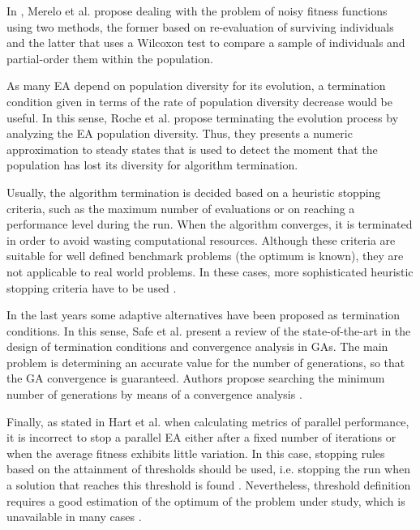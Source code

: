 \documentclass[runningheads,a4paper]{llncs}
\begin{document}


In \cite{merelo14:noisy}, Merelo et al. propose dealing with the problem of noisy fitness functions using two methods, the former based on re-evaluation of surviving individuals and the latter that uses a Wilcoxon test to compare a sample of individuals and partial-order them within the population.


As many EA depend on population diversity for its evolution, a termination condition given in terms of the rate of population diversity decrease would be useful. 
In this sense, Roche et al. \cite{RocheTermination13} propose terminating the evolution process by analyzing the EA population diversity. Thus, they presents a numeric approximation to steady states that is used to detect the moment that the population has lost its diversity for algorithm termination.


Usually, the algorithm termination is decided based on a heuristic stopping criteria, such as the maximum number of evaluations or on reaching a performance level during the run. 
When the algorithm converges, it is terminated in order to avoid wasting computational resources.
Although these criteria are suitable for well defined benchmark problems (the optimum is known), they are not applicable to real world problems. 
In these cases, more sophisticated heuristic stopping criteria have to be used \cite{NME2909,Wagner2009,Wagner2010}.

In the last years some adaptive alternatives have been proposed  as termination conditions.
In this sense, Safe et al. \cite{Safe2004} present a review of the state-of-the-art in the design of termination conditions and convergence analysis in GAs.
The main problem is determining an accurate value for the number of generations, so that the GA convergence is guaranteed.
Authors propose searching the minimum number of generations by means of a convergence analysis \cite{Rudolph1994}.


Finally, as stated in Hart et al. \cite{Hart1996} when calculating metrics of parallel performance, it is incorrect to stop a parallel EA either after a fixed number of iterations or when the average fitness exhibits little variation. In this case, stopping rules based on the attainment of thresholds should be used, i.e. stopping the run when a solution that reaches this threshold is found \cite{Sena2001}. Nevertheless, threshold definition requires a good estimation of the optimum of the problem under study, which is unavailable in many cases \cite{Safe2004}.
\end{document}
